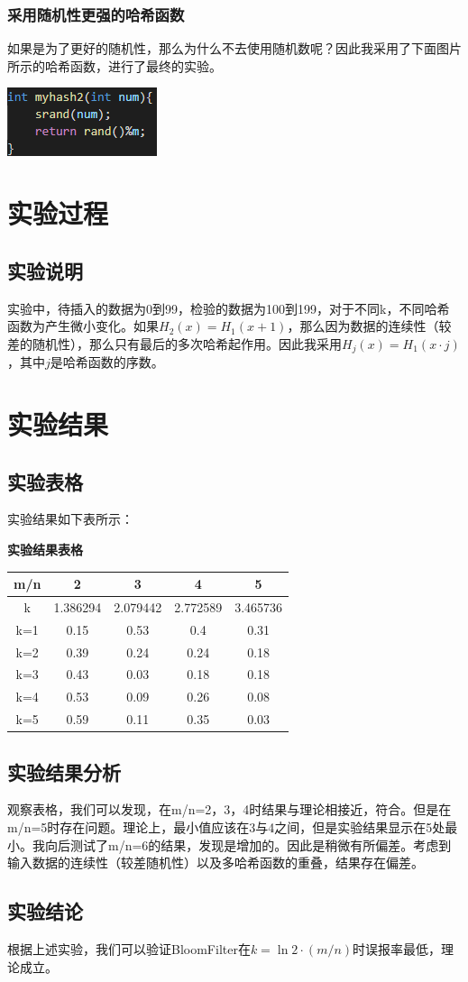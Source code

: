 \documentclass[UTF8]{ctexart}
\begin{document}
\subsubsection{采用随机性更强的哈希函数}
如果是为了更好的随机性，那么为什么不去使用随机数呢？因此我采用了下面图片所示的哈希函数，进行了最终的实验。
\begin{center}
    \includegraphics[scale=1.2]{hash2.png}
\end{center}
\section{实验过程}
\subsection{实验说明}
实验中，待插入的数据为0到99，检验的数据为100到199，对于不同k，不同哈希函数为产生微小变化。如果$H_2(x)=H_1(x+1)$，那么因为数据的连续性（较差的随机性），那么只有最后的多次哈希起作用。因此我采用$H_j(x)=H_1(x \cdot j)$，其中$j$是哈希函数的序数。
\section{实验结果}
\subsection{实验表格}
实验结果如下表所示：
\begin{table}[hp]
    \centering
    \textbf{实验结果表格}\\
    \begin{tabular}{|c|c|c|c|c|}
        \hline
        m/n& 2&	3&	4&5\\
        \hline
        k&	1.386294&	2.079442&	2.772589&3.465736\\
        \hline
        k=1&	0.15&	0.53&	0.4&0.31\\
        \hline
        k=2&	0.39&	0.24&	0.24&0.18\\
        \hline
        k=3&	0.43&	0.03&	0.18&0.18\\
        \hline
        k=4&	0.53&	0.09&	0.26&0.08\\
        \hline
        k=5&	0.59&	0.11&	0.35&0.03\\
        \hline
    \end{tabular}
\end{table}
\newpage
\subsection{实验结果分析}
观察表格，我们可以发现，在m/n=2，3，4时结果与理论相接近，符合。但是在m/n=5时存在问题。理论上，最小值应该在3与4之间，但是实验结果显示在5处最小。我向后测试了m/n=6的结果，发现是增加的。因此是稍微有所偏差。考虑到输入数据的连续性（较差随机性）以及多哈希函数的重叠，结果存在偏差。
\subsection{实验结论}
根据上述实验，我们可以验证BloomFilter在$k=\ln 2 \cdot (m/n)$时误报率最低，理论成立。
\end{document}
